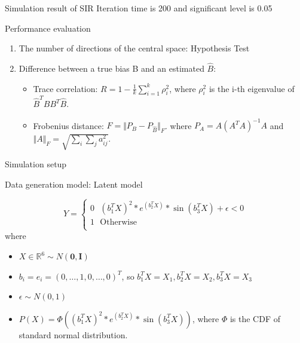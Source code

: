 \documentclass[ignorenonframetext,]{beamer}
\providecommand{\tightlist}{%
  \setlength{\itemsep}{0pt}\setlength{\parskip}{0pt}}
\begin{document}
\begin{frame}{Simulation result of SIR}
Iteration time is 200 and significant level is 0.05

\begin{block}{Performance evaluation}

\begin{enumerate}
\def\labelenumi{\arabic{enumi}.}
\tightlist
\item
  The number of directions of the central space: Hypothesis Test
\item
  Difference between a true bias B and an estimated \(\hat{B}\):

  \begin{itemize}
  \tightlist
  \item
    Trace correlation: \(R = 1 - \frac{1}{k}\sum_{i = 1}^k \rho_i^2\),
    where \(\rho^2_i\) is the i-th eigenvalue of
    \(\hat{B}^TBB^T\hat{B}\).
  \item
    Frobenius distance: \(F = \Vert P_B - P_{\hat{B}}\Vert_F\). where
    \(P_A = A(A^TA)^{-1}A\) and
    \(\Vert A\Vert_F = \sqrt{\sum_i\sum_j a^2_{ij}}\).
  \end{itemize}
\end{enumerate}

\end{block}

\end{frame}

\begin{frame}{Simulation setup}

\begin{block}{Data generation model: Latent model}

\[
    Y=\left\{
                \begin{array}{ll}
                  0 ~~~(b_1^TX)^2*e^{(b_2^TX)}*\sin(b_3^TX) + \epsilon < 0 \\
                  1 ~~~\text{Otherwise} \\
                \end{array}
      \right.
\] where

\begin{itemize}
\tightlist
\item
  \(X \in \mathbb{R}^6 \sim N(\mathbf 0, \mathbf I)\)
\item
  \(b_i = e_i = (0,\dots, 1,0,\dots,0)^T\), so
  \(b_1^TX = X_1, b_2^TX = X_2, b_3^TX = X_3\)
\item
  \(\epsilon \sim N(0,1)\)
\item
  \(P(X) = \Phi((b_1^TX)^2*e^{(b_2^TX)}*\sin(b_3^TX))\), where \(\Phi\)
  is the CDF of standard normal distribution.
\end{itemize}

\end{block}

\end{frame}
\end{document}

